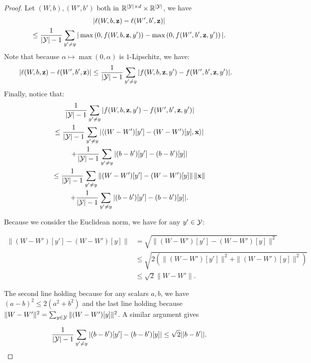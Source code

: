 \begin{noaddcontents}
    \begin{proof}
        Let $(W,b),(W',b')$ both in $ \mathbb{R}^{|\mathcal{Y}|\times d}\times \mathbb{R}^{|\mathcal{Y}|}$, we have
        \begin{multline*}
            |\ell(W,b,\mathbf{z})- \ell(W',b',\mathbf{z})| \\ \leq \frac{1}{|\mathcal{Y}|-1}\sum_{y^\prime \neq y} |\max\left(0, f(W,b,\mathbf{z},y') \right) - \max\left(0, f(W',b',\mathbf{z},y') \right)|.
        \end{multline*}
        Note that because $\alpha\mapsto\max(0,\alpha)$ is $1$-Lipschitz, we have: 
        \begin{align*}
            |\ell(W,b,\mathbf{z})- \ell(W',b',\mathbf{z})| & \leq \frac{1}{|\mathcal{Y}|-1}\sum_{y^\prime \neq y} | f(W,b,\mathbf{z},y') - f(W',b',\mathbf{z},y')|.
        \end{align*}
        Finally, notice that: 
        \begin{multline*}
            \frac{1}{|\mathcal{Y}|-1}\sum_{y^\prime \neq y} | f(W,b,\mathbf{z},y')  -f(W',b',\mathbf{z},y')| \\
            \le \frac{1}{|\mathcal{Y}|-1}\sum_{y^\prime \neq y} \left|\left\langle (W-W')[y'] - (W-W')[y],\mathbf{x}\right\rangle   \right| \\
            + \frac{1}{|\mathcal{Y}|-1}\sum_{y^\prime \neq y} |(b-b')[y'] - (b-b')[y]|\\
             \leq \frac{1}{|\mathcal{Y}|-1}\sum_{y^\prime \neq y} \left\| (W-W')[y'] - (W-W')[y]  \right\|\|\mathbf{x}\|
              \\+ \frac{1}{|\mathcal{Y}|-1}\sum_{y^\prime \neq y} |(b-b')[y'] - (b-b')[y]|.
        \end{multline*}
    
    
       Because we consider the Euclidean norm, we have for any $y'\in\mathcal{Y}$:
    
        \begin{align*}
            \left\| (W-W')[y'] - (W-W')[y]  \right\| & = \sqrt{\| (W-W')[y'] - (W-W')[y]\|^2} \\
            & \leq \sqrt{2 \left(\|(W-W')[y']\|^2 + \|(W-W')[y]\|^2 \right)} \\
            & \leq \sqrt{2}\|W-W'\|.
        \end{align*}
    
        The second line holding because for any scalars $a,b$, we have $(a-b)^2 \leq 2(a^2 + b^2)$ and the last line holding because $\|W-W'\|^2= \sum_{y\in\mathcal{Y}} \|(W-W')[y]\|^2$.
        A similar argument gives
    
        \[\frac{1}{|\mathcal{Y}|-1}\sum_{y^\prime \neq y} |(b-b')[y'] - (b-b')[y]| \leq \sqrt{2}||b-b'||.\]
    

\end{proof}
\end{noaddcontents}
